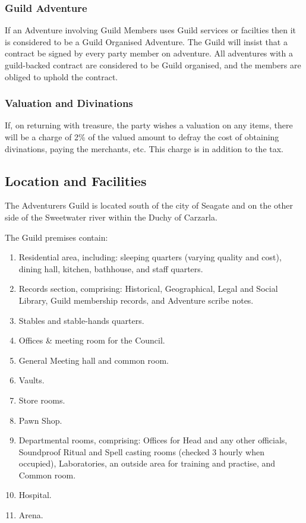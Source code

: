 \documentclass[twoside,a4paper]{article}
\begin{document}
\begin{multicols}{2}
\subsubsection{Guild Adventure}

If an Adventure involving Guild Members uses Guild services or
facilties then it is considered to be a Guild Organised Adventure.
The Guild will insist that a contract be signed by every party member
on adventure.  All adventures with a guild-backed contract are
considered to be Guild organised, and the members are obliged to
uphold the contract.

\subsubsection{Valuation and Divinations}

If, on returning with treasure, the party wishes a valuation on any
items, there will be a charge of 2\% of the valued amount to defray
the cost of obtaining divinations, paying the merchants, etc. This
charge is in addition to the tax.


\subsection{Location and Facilities}

The Adventurers Guild is located south of the city of Seagate and on
the other side of the Sweetwater river within the Duchy of Carzarla.

The Guild premises contain:

\begin{enumerate}
\item Residential area, including: sleeping
      quarters (varying quality and cost),
      dining hall, kitchen, bathhouse, and staff
      quarters.

\item Records section, comprising: Historical,
      Geographical, Legal and Social Library,
      Guild membership records, and
      Adventure scribe notes.

\item Stables and stable-hands quarters.
\item Offices \& meeting room for the Council.
\item General Meeting hall and common room.
\item Vaults.
\item Store rooms.
\item Pawn Shop.
\item Departmental rooms, comprising:
      Offices for Head and any other officials,
      Soundproof Ritual and Spell casting
      rooms (checked 3 hourly when
      occupied), Laboratories, an outside area
      for training and practise, and Common
      room.
\item Hospital.
\item Arena.
\end{enumerate}


\end{multicols}
\end{document}
